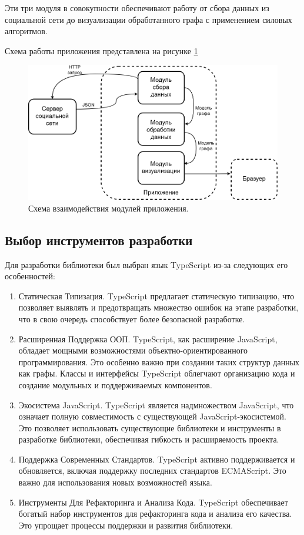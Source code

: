 \documentclass[14pt, russian]{scrartcl}
\begin{document}
Эти три модуля в совокупности обеспечивают работу от сбора данных из социальной сети до визуализации обработанного графа с применением силовых алгоритмов.

Схема работы приложения представлена на рисунке \ref{fig:app_scheme}


\begin{figure}[H]
	\centering
	\begin{minipage}[t]{.9\textwidth}
		\centering
		\includegraphics[width=.9\textwidth]{./imgs/app_scheme.png}
	\end{minipage}
	\caption{Схема взаимодействия модулей приложения.}
	\label{fig:app_scheme}
\end{figure}

\subsection{Выбор инструментов разработки}

Для разработки библиотеки был выбран язык TypeScript \cite{TS} из-за следующих его особенностей:

\begin{enumerate}
	\item Статическая Типизация. TypeScript предлагает статическую типизацию, что позволяет выявлять и предотвращать множество ошибок на этапе разработки, что в свою очередь способствует более безопасной разработке.
	\item Расширенная Поддержка ООП. TypeScript, как расширение JavaScript, обладает мощными возможностями объектно-ориентированного программирования. Это особенно важно при создании таких структур данных как графы. Классы и интерфейсы TypeScript облегчают организацию кода и создание модульных и поддерживаемых компонентов.
	\item Экосистема JavaScript. TypeScript является надмножеством JavaScript, что означает полную совместимость с существующей JavaScript-экосистемой. Это позволяет использовать существующие библиотеки и инструменты в разработке библиотеки, обеспечивая гибкость и расширяемость проекта.
	\item Поддержка Современных Стандартов. TypeScript активно поддерживается и обновляется, включая поддержку последних стандартов ECMAScript. Это важно для использования новых возможностей языка.
	\item Инструменты Для Рефакторинга и Анализа Кода. TypeScript обеспечивает богатый набор инструментов для рефакторинга кода и анализа его качества. Это упрощает процессы поддержки и развития библиотеки.
\end{enumerate}
\end{document}
